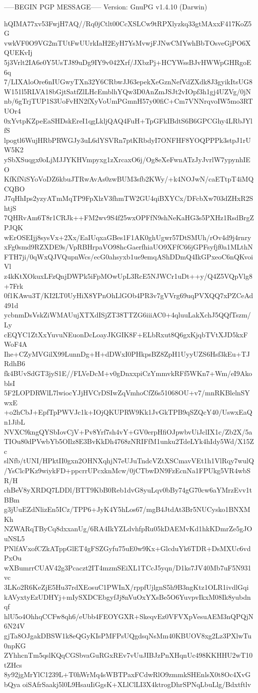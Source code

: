 -----BEGIN PGP MESSAGE-----
Version: GnuPG v1.4.10 (Darwin)

hQIMA77xv53FwjH7AQ//Rq0jCtlt00CcXSLCw9tRPXlyzkq33gtMAxxF417KoZ5G
vwkVF0O9VG2mTUtFwUUrkIaH2EyH7YsMvwjFJNwCMYwhBbTOsveGjPO6XQUEKvIj
5j3Vrlt2IA6e0Y5UsTJ89uDg9IY9v042Xrf/JXbzPj+HCYWssBJvHWWpGHRgoE6q
7/LIXAloOre6nIUGwyTXn32Y6CRbwJJ63epekXeGznNefVdZXdk8J3gyikItsUG8
W151l5RLVA18bGjtSatfZlLHcEmblhYQw3D0AnZmJSJt2vIOpf3h1gj4UZVg/0jN
nb/6gTrjTUP1S3UoFvHN2fXyVoUmPGmnH57y00fiC+Cm7VNNrqvoIW5mo3RTUOr4
0xYvtpKZpeEaSHDskEreI1qgLkljQAQ4FuH+TpGFkIBdtS6B6GPCGhy4LRbJYlfS
lpogtl6WujHRbPRWGJy3uL6dYSVRn7ptKRbdyI7ONFHF8YOQPPPk3stpJ1rUW5K2
ySbXSuqgx0oLjMJJYKHVmpyxg1zXrcaxO6j/Og8eXeFwnATzJyJvrlW7ypynhIEO
KfKfNiSYoVoDZ6kbuJTRwAvAs0zwBUM3sfb2KWy/+k4NOJwN/caETtpT4iMQCQBO
J7qHhIps2yzyATmMqTP9FpXlzV3fhmTW2GU4qiBXYCx/DFcbXw703dZHxR2ShtjS
7QHRvAm6T8r1CRJk++FM2wv9S4f25wxOPFfN9shNeKaHG3s5PXHz1RsdBrgZPJQK
wErOSEIjj8sysVx+2Xx/EaIUqxaGBes1F1AK0ghUgwr57DtSMUh/rOv4d9j4rnry
xFg0smd9RZXDE9s/VpRBHrpaVO98hcGaerfhiaUO9XFfC66jGPFsyfjf0a1MLthN
FTH7ji/0qWxQJVQupnWcs/ecG0ahsyxb1ue9emqAShDDmQ4IkGPxeoC6nQKvoiVl
z4kKtXOkuxLFzQnjDWPk5iFpMOwUpL3RcE5NJWCr1uDt++y/Q4Z5VQpVlg8+7Frk
0f1KAwu3T/KI2LT0UyHiX8YPnOhLlGOb4PR3v7gVVrg69uqPVXQQ7xPZCeAd491d
ycbnmDsVskZiWMAUujXTXdISjZT38TTZG6iiiAC0+4qluuLakXchJ5QQfTszm/Ly
cEQYC1ZtXxYuvuNEuonDcLoayJKGIK8F+ELbRxut8Q6gxKjqbTVtXJD5kxFWoF4A
Ihe+CZyMVGilX99LunnDg+H+dDWxI0PHkpsBZ8ZpH1UyyUZS6Hsf3kEu+TJRdhB6
fk4BUvSdGT3jyS1E//FLVeDcM+v0gDnxxpiCzYmmvkRFf5WKn7+Wm/eI9AkoblsI
5F2LOPDRWlL7lwiocYJjHVCrDSIwZqVmhoCfZ6s51068OU+v7/mnRKBlelnSYwxE
+o2hCbJ+EpfTpPWVJc1k+IOjQKUPRW9Kk1JvGkTPB9qSZQcY40/UswxEaQn1JibL
NVXC9kngQYSbIovCjV+Pv8Yrf7sh4vY+GV0erpHfiOJpwbvUiJclIX1c/Zb2X/5a
TIOu80dPVwbYb5OIlz8E3BvKkDh4768zNRIFfM1unku2TdeLYk4hIdy5Wd/X15Zc
slNfb/tUNI/HPktII0gxn2OHNXqhjN7eUJuTndcVZtXSCmavVEt1h1VlRqy7wulQ
/YsClcPKz9wiykFD+ppcrrUPcxknMcw/0jCTbwDN9FzEcnNa1FPUkg5VR4wbSR/H
chBeV8yXRDQ7LDDl/BTT9KbB0Reb1dvG8yuLqv0bBy74gG70cw6aYMrzEvv1tBBm
g3jUuEZdNlizEn5ICz/TPP6+JyK4Y5hLos67/mgB4JtdAt3Br5NUCysko1BNXMKh
NZWARqTByCq8dxxanUg/6RA4IkYZLdvhfpRu05kDAEMvKd1hkKDmrZe5gJOuNSL5
PNlfAVxofCZkATppGlET4gFSZGyfu75uE0w9Kx+GlcduYk6TDR+DsMXUc6vdPxOu
wXBumrrCUAV42g3Pcaczt2IT4mzmSEiXL1TCcJ5yqn/D1ks7JV40Mb7uF5N931vc
3LKo2R6KeZjE5Hu37rdXEosuC1PWInX/rppfUjlgnS5h9B3ngKtz1OLR1ivdlGqi
kAVyxtyEzUDHYj+mIySXDCEbgyfJj8nVuOxYXsBe5O6YuvpvIkxM08Ik8yubdnqf
hlU5o4OhhqCCFw8qh6/eUbb4FEOYGXR+SkeqvEz0VFVXpVesuAEM3nQPQjN6N24V
gjTa8OJgakDBSW1k8eQGyKIsPMFPsUQgdsqNsMm40KBUOV8xg2Lz3PXlwTu0npKG
ZYhhcnTm5qslKQqCGSbvaGuRGxREv7vUuJIBJzPnXHqnUc498KKHHU2wT10tZHcs
8y92jgMrYlC1239L+T0hWrMq4sWBTPaxFCdwRlO9zmmkSHEnlsX0t8Oc4XvGbQya
oiSAfrSaakj5l0L9HsauIiGgsK+XLlClLI3X4ktrogDhrSPNqLbuLlg/Bdxtftlv
